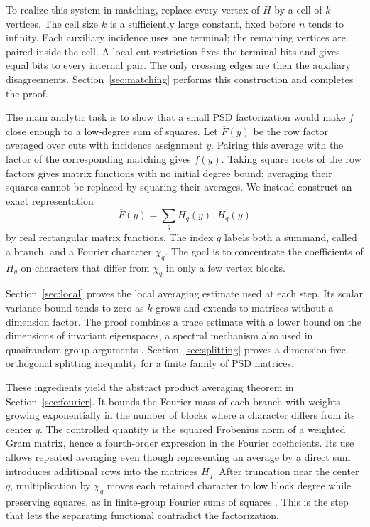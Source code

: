 To realize this system in matching, replace every vertex of $H$
by a cell of $k$ vertices.  The cell size $k$ is a sufficiently
large constant, fixed before $n$ tends to infinity.  Each auxiliary
incidence uses one terminal; the remaining vertices are paired
inside the cell.  A local cut restriction fixes the terminal bits
and gives equal bits to every internal pair.  The only crossing
edges are then the auxiliary disagreements.  Section~\ref{sec:matching}
performs this construction and completes the proof.

The main analytic task is to show that a small PSD factorization
would make $f$ close enough to a low-degree sum of squares.
Let $\overline F(y)$ be the row factor averaged over cuts with
incidence assignment $y$.  Pairing this average with the factor of
the corresponding matching gives $f(y)$.  Taking square roots of
the row factors gives matrix functions with no initial degree bound;
averaging their squares cannot be replaced by squaring their
averages.  We instead construct an exact representation
\[
 \overline F(y)=\sum_q H_q(y)^{\mathsf T}H_q(y)
\]
by real rectangular matrix functions.  The index $q$ labels both
a summand, called a branch, and a Fourier character $\chi_q$.
The goal is to concentrate the coefficients of $H_q$ on characters
that differ from $\chi_q$ in only a few vertex blocks.

Section~\ref{sec:local} proves the local averaging estimate used
at each step.  Its scalar variance bound tends to zero as $k$
grows and extends to matrices without a dimension factor.
The proof combines a trace estimate with a lower bound on the
dimensions of invariant eigenspaces, a spectral mechanism also
used in quasirandom-group arguments \cite{gowers}.
Section~\ref{sec:splitting} proves a dimension-free orthogonal
splitting inequality for a finite family of PSD matrices.

These ingredients yield the abstract product averaging theorem
in Section~\ref{sec:fourier}.  It bounds the Fourier mass of each
branch with weights growing exponentially in the number of blocks
where a character differs from its center $q$.  The controlled quantity is
the squared Frobenius norm of a weighted Gram matrix, hence a
fourth-order expression in the Fourier coefficients.  Its use
allows repeated averaging even though representing an average by
a direct sum introduces additional rows into the matrices $H_q$.
After truncation near the center $q$, multiplication by $\chi_q$
moves each retained character to low block degree while
preserving squares, as in finite-group Fourier sums of squares
\cite{fsp-sparse}.  This is the step that lets the separating
functional contradict the factorization.

